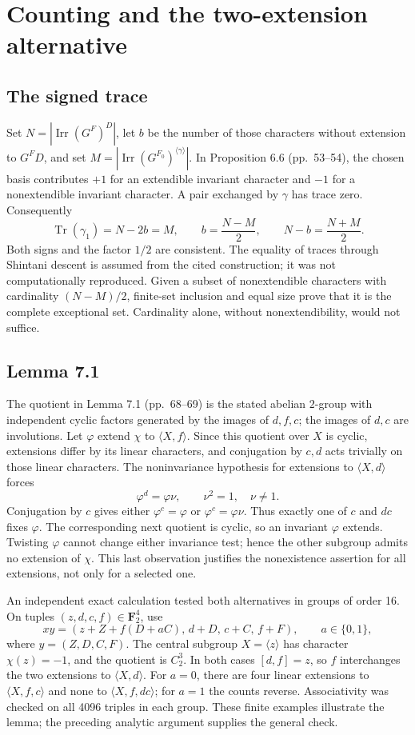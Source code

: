 \documentclass[10pt]{article}
\begin{document}
\section*{Counting and the two-extension alternative}
\subsection*{The signed trace}
Set \(N=|\operatorname{Irr}(G^F)^D|\), let \(b\) be the number of those characters without extension to \(G^F D\), and set \(M=|\operatorname{Irr}(G^{F_0})^{\langle\gamma\rangle}|\). In Proposition 6.6 (pp. 53–54), the chosen basis contributes \(+1\) for an extendible invariant character and \(-1\) for a nonextendible invariant character. A pair exchanged by \(\gamma\) has trace zero. Consequently \[\operatorname{Tr}(\gamma_1)=N-2b=M,\qquad
 b=\frac{N-M}{2},\qquad N-b=\frac{N+M}{2}.\] Both signs and the factor \(1/2\) are consistent. The equality of traces through Shintani descent is assumed from the cited construction; it was not computationally reproduced. Given a subset of nonextendible characters with cardinality \((N-M)/2\), finite-set inclusion and equal size prove that it is the complete exceptional set. Cardinality alone, without nonextendibility, would not suffice.\par
\subsection*{Lemma 7.1}
The quotient in Lemma 7.1 (pp. 68–69) is the stated abelian \(2\)-group with independent cyclic factors generated by the images of \(d,f,c\); the images of \(d,c\) are involutions. Let \(\varphi\) extend \(\chi\) to \(\langle X,f\rangle\). Since this quotient over \(X\) is cyclic, extensions differ by its linear characters, and conjugation by \(c,d\) acts trivially on those linear characters. The noninvariance hypothesis for extensions to \(\langle X,d\rangle\) forces \[\varphi^d=\varphi\nu,\qquad \nu^2=1,\quad \nu\neq1.\] Conjugation by \(c\) gives either \(\varphi^c=\varphi\) or \(\varphi^c=\varphi\nu\). Thus exactly one of \(c\) and \(dc\) fixes \(\varphi\). The corresponding next quotient is cyclic, so an invariant \(\varphi\) extends. Twisting \(\varphi\) cannot change either invariance test; hence the other subgroup admits no extension of \(\chi\). This last observation justifies the nonexistence assertion for all extensions, not only for a selected one.\par
An independent exact calculation tested both alternatives in groups of order 16. On tuples \((z,d,c,f)\in\mathbf F_2^4\), use \[x y=(z+Z+f(D+aC),\,d+D,\,c+C,\,f+F),\qquad a\in\{0,1\},\] where \(y=(Z,D,C,F)\). The central subgroup \(X=\langle z\rangle\) has character \(\chi(z)=-1\), and the quotient is \(C_2^3\). In both cases \([d,f]=z\), so \(f\) interchanges the two extensions to \(\langle X,d\rangle\). For \(a=0\), there are four linear extensions to \(\langle X,f,c\rangle\) and none to \(\langle X,f,dc\rangle\); for \(a=1\) the counts reverse. Associativity was checked on all 4096 triples in each group. These finite examples illustrate the lemma; the preceding analytic argument supplies the general check.\par
\end{document}
